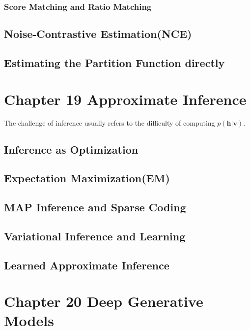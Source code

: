 \documentclass[12pt]{article}
\numberwithin{equation}{section}
\begin{document}
\subsubsection{Score Matching and Ratio Matching}
\subsection{Noise-Contrastive Estimation(NCE)}
\subsection{Estimating the Partition Function directly}
\section{Chapter 19 Approximate Inference}
The challenge of inference usually refers to the difficulty of computing $p(\bm{h}|\bm{v})$.\par
\subsection{Inference as Optimization }
\subsection{Expectation Maximization(EM)}
\subsection{MAP Inference and Sparse Coding}
\subsection{Variational Inference and Learning}
\subsection{Learned Approximate Inference} 
\section{Chapter 20 Deep Generative Models}
\end{document}

